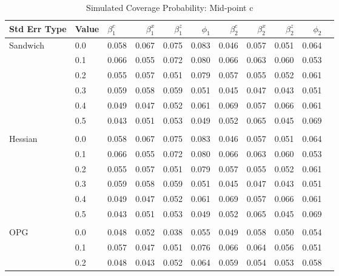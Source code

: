 \documentclass[12pt]{article}
\theoremstyle{definition}
\begin{document}
\begin{table}[b!] \centering
  \caption{Simulated Coverage Probability: Mid-point c}
  \begin{threeparttable}
    {\footnotesize
    \begin{tabular}[r]{l l l r r r r r r r r}
  \hline
Std Err Type & Value & $\beta_{1}^{c}$ & $\beta_{1}^{x}$ & $\beta_{1}^{z}$ & $\phi_{1}$ & $\beta_{2}^{c}$ & $\beta_{2}^{x}$ & $\beta_{2}^{z}$ & $\phi_{2}$ \\ 
  \hline

Sandwich  & 0.0 & 0.058 & 0.067 & 0.075 & 0.083 & 0.046 & 0.057 & 0.051 & 0.064 \\
          & 0.1 & 0.066 & 0.055 & 0.072 & 0.080 & 0.066 & 0.063 & 0.060 & 0.053 \\
          & 0.2 & 0.055 & 0.057 & 0.051 & 0.079 & 0.057 & 0.055 & 0.052 & 0.061 \\
          & 0.3 & 0.059 & 0.058 & 0.059 & 0.051 & 0.045 & 0.047 & 0.043 & 0.051 \\
          & 0.4 & 0.049 & 0.047 & 0.052 & 0.061 & 0.069 & 0.057 & 0.066 & 0.061 \\
          & 0.5 & 0.043 & 0.051 & 0.053 & 0.049 & 0.052 & 0.065 & 0.045 & 0.069 \\
          &     &       &       &       &       &       &       &       &       \\
Hessian   & 0.0 & 0.058 & 0.067 & 0.075 & 0.083 & 0.046 & 0.057 & 0.051 & 0.064 \\
          & 0.1 & 0.066 & 0.055 & 0.072 & 0.080 & 0.066 & 0.063 & 0.060 & 0.053 \\
          & 0.2 & 0.055 & 0.057 & 0.051 & 0.079 & 0.057 & 0.055 & 0.052 & 0.061 \\
          & 0.3 & 0.059 & 0.058 & 0.059 & 0.051 & 0.045 & 0.047 & 0.043 & 0.051 \\
          & 0.4 & 0.049 & 0.047 & 0.052 & 0.061 & 0.069 & 0.057 & 0.066 & 0.061 \\
          & 0.5 & 0.043 & 0.051 & 0.053 & 0.049 & 0.052 & 0.065 & 0.045 & 0.069 \\
          &     &       &       &       &       &       &       &       &       \\
OPG       & 0.0 & 0.048 & 0.052 & 0.038 & 0.055 & 0.049 & 0.058 & 0.050 & 0.054 \\
          & 0.1 & 0.057 & 0.047 & 0.051 & 0.076 & 0.066 & 0.064 & 0.056 & 0.051 \\
          & 0.2 & 0.048 & 0.043 & 0.052 & 0.064 & 0.059 & 0.054 & 0.053 & 0.058 \\

\end{tabular}}
\end{threeparttable}
\end{table}
\end{document}
